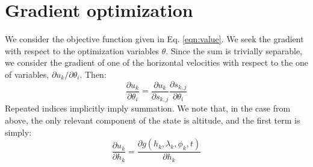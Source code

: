 \documentclass[11pt]{scrartcl} %
\begin{document}
\section{Gradient optimization}
We consider the objective function given in Eq. \ref{eqn:value}. We seek the gradient with respect to the optimization variables $\theta$. Since the sum is trivially separable, we consider the gradient of one of the horizontal velocities with respect to the one of variables, $\partial u_k/\partial \theta_i$. Then:
\[\frac{\partial u_k}{\partial \theta_i} = \frac{\partial u_k}{\partial s_{k,j}}\frac{\partial s_{k,j}}{\partial \theta_i}\]
Repeated indices implicitly imply summation. We note that, in the case from above, the only relevant component of the state is altitude, and the first term is simply:
\[\frac{\partial u_k}{\partial h_k} = \frac{\partial g(h_k, \lambda_k, \phi_k, t)}{\partial h_k}\]
\end{document}
